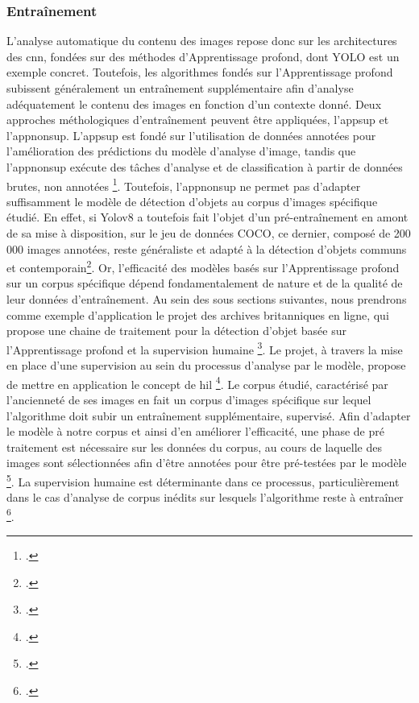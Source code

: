 \subsubsection{Entraînement}

L'analyse automatique du contenu des images repose donc sur les architectures des \gls{cnn}, fondées sur des méthodes d'\gls{Apprentissage profond}, dont YOLO est un exemple concret. Toutefois, les algorithmes fondés sur l'\gls{Apprentissage profond} subissent généralement un entraînement supplémentaire afin d'analyse adéquatement le contenu des images en fonction d'un contexte donné. Deux approches méthologiques d'entraînement peuvent être appliquées, l'\gls{appsup} et l'\gls{appnonsup}. L'\gls{appsup} est fondé sur l'utilisation de données annotées pour l'amélioration des prédictions du modèle d'analyse d'image, tandis que l'\gls{appnonsup} exécute des tâches d'analyse et de classification à partir de données brutes, non annotées \footcite{delua2024}. Toutefois, l'\gls{appnonsup} ne permet pas d'adapter suffisamment le modèle de détection d'objets au corpus d'images spécifique étudié. En effet, si Yolov8 a toutefois fait l'objet d'un pré-entraînement en amont de sa mise à disposition, sur le jeu de données COCO, ce dernier, composé de 200 000 images annotées, reste généraliste et adapté à la détection d'objets communs et contemporain\footcite{2023b}. Or, l'efficacité des modèles basés sur l'\gls{Apprentissage profond} sur un corpus spécifique dépend fondamentalement de nature et de la qualité de leur données d'entraînement. 
Au sein des sous sections suivantes, nous prendrons comme exemple d’application le projet des archives britanniques en ligne, qui propose une chaine de traitement pour la détection d’objet basée sur l'\gls{Apprentissage profond} et la supervision humaine \footcite{kasturi2024}. Le projet, à travers la mise en place d'une supervision au sein du processus d'analyse par le modèle, propose de mettre en application le concept de \gls{hil} \footcite{kasturi2024}.
Le corpus étudié, caractérisé par l'ancienneté de ses images en fait un corpus d’images spécifique sur lequel l’algorithme doit subir un entraînement supplémentaire, supervisé. Afin d'adapter le modèle à notre corpus et ainsi d'en améliorer l'efficacité, une phase de pré traitement est nécessaire sur les données du corpus, au cours de laquelle des images sont sélectionnées afin d’être annotées pour être pré-testées par le modèle \footcite{kasturi2024}. La supervision humaine est déterminante dans ce processus, particulièrement dans le cas d’analyse de corpus inédits sur lesquels l’algorithme reste à entraîner \footcite{kasturi2024}. 
